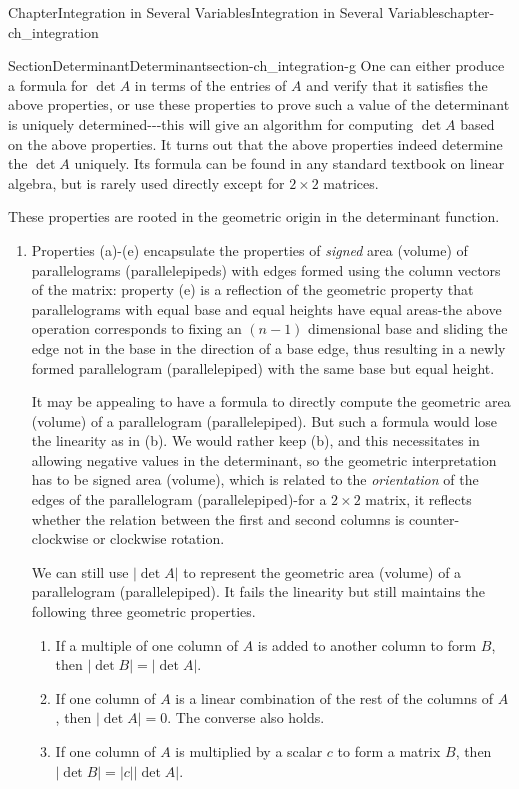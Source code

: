 \documentclass[oneside,10pt,]{book}
\numberwithin{equation}{section}
\begin{document}
\begin{chapterptx}{Chapter}{Integration in Several Variables}{}{Integration in Several Variables}{}{}{chapter-ch_integration}
\begin{sectionptx}{Section}{Determinant}{}{Determinant}{}{}{section-ch_integration-g}
One can either produce a formula for \(\det A\) in terms of the entries of \(A\) and verify that it satisfies the above properties, or use these properties to prove such a value of the determinant is uniquely determined-{}-{}-this will give an algorithm for computing \(\det A\) based on the above properties. It turns out that the above properties indeed determine the \(\det A\) uniquely. Its formula can be found in any standard textbook on linear algebra, but is rarely used directly except for \(2\times 2\) matrices.%
\par
These properties are rooted in  the geometric origin in the determinant function.%
\begin{enumerate}
\item{}Properties (a)-(e) encapsulate the properties of \emph{signed} area (volume) of parallelograms (parallelepipeds) with edges formed using the column vectors of the matrix: property (e) is a reflection of the geometric property that parallelograms with equal base and equal heights have equal areas-the above operation corresponds to fixing an \((n-1)\) dimensional base and sliding the edge not in the base in the direction of a base edge, thus resulting in a  newly formed parallelogram (parallelepiped)  with the same base but equal height.%
\par
It may be appealing to have a formula to directly compute the geometric area (volume) of a parallelogram (parallelepiped). But such a formula would lose the linearity as in (b).  We would rather keep (b), and this necessitates in allowing negative values in the determinant, so the geometric interpretation has to be signed area (volume), which is related to the \emph{orientation} of the edges of the parallelogram (parallelepiped)-for a \(2\times 2\) matrix, it reflects whether the relation between the first and second columns is counter-clockwise or clockwise rotation.%
\par
We can still use \(\vert \det A \vert \) to represent the  geometric area (volume) of a parallelogram (parallelepiped). It fails the linearity but still maintains the following three geometric properties.%
\begin{enumerate}[label=(\roman*)]
\item{}If a multiple of one column of \(A\) is added to another column to form \(B\), then \(|\det B|=|\det A|\).%
\item{}If one column of \(A\) is a linear combination of the rest of the columns of \(A\), then \(|\det A|=0\). The converse also holds.%
\item{}If one column of \(A\) is multiplied  by a scalar \(c\) to form a matrix \(B\), then \(|\det B|=|c| |\det A|\).%

\end{enumerate}
\end{enumerate}
\end{sectionptx}
\end{chapterptx}
\end{document}
